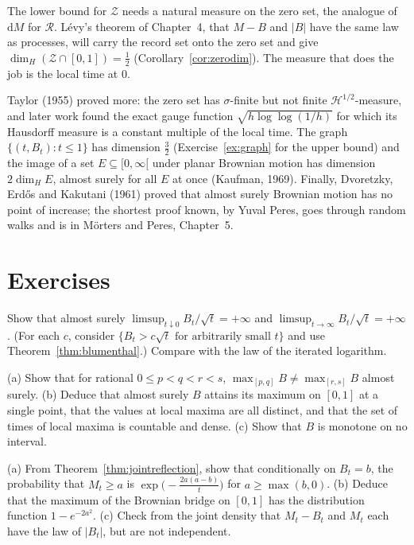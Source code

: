 The lower bound for $\mathcal Z$ needs a natural measure on the zero set, the analogue of $\mathrm dM$ for $\mathcal R$. L\'evy's theorem of Chapter~4, that $M-B$ and $|B|$ have the same law as processes, will
carry the record set onto the zero set and give $\dim_H(\mathcal Z\cap[0,1])=\frac12$ (Corollary~\ref{cor:zerodim}). The measure that does the job is the local time at $0$.

\begin{remark}
Taylor (1955) proved more: the zero set has $\sigma$-finite but not finite $\mathcal H^{1/2}$-measure, and later work found the exact gauge function $\sqrt{h\log\log(1/h)}$ for which its Hausdorff measure is
a constant multiple of the local time. The graph $\{(t,B_t):t\le1\}$ has dimension $\frac32$ (Exercise~\ref{ex:graph} for the upper bound) and the image of a set $E\subseteq[0,\infty[$ under planar Brownian motion has
dimension $2\dim_HE$, almost surely for all $E$ at once (Kaufman, 1969). Finally, Dvoretzky, Erd\H{o}s and Kakutani (1961) proved that almost surely Brownian motion has no point of increase; the shortest proof
known, by Yuval Peres, goes through random walks and is in M\"orters and Peres, Chapter~5.
\end{remark}

\section{Exercises}

\begin{exercise}[$\star$]\label{ex:limsupsqrt}
Show that almost surely $\limsup_{t\downarrow0}B_t/\sqrt t=+\infty$ and $\limsup_{t\to\infty}B_t/\sqrt t=+\infty$. (For each $c$, consider $\{B_t>c\sqrt t\text{ for arbitrarily small }t\}$ and use
Theorem~\ref{thm:blumenthal}.) Compare with the law of the iterated logarithm.
\end{exercise}

\begin{exercise}[$\star\star$]\label{ex:localmax}
(a) Show that for rational $0\le p<q<r<s$, $\max_{[p,q]}B\neq\max_{[r,s]}B$ almost surely. (b) Deduce that almost surely $B$ attains its maximum on $[0,1]$ at a single point, that the values at local maxima
are all distinct, and that the set of times of local maxima is countable and dense. (c) Show that $B$ is monotone on no interval.
\end{exercise}

\begin{exercise}[$\star\star$]\label{ex:bridgemax}
(a) From Theorem~\ref{thm:jointreflection}, show that conditionally on $B_t=b$, the probability that $M_t\ge a$ is $\exp\bigl(-\frac{2a(a-b)}t\bigr)$ for $a\ge\max(b,0)$. (b) Deduce that the maximum of the Brownian bridge
on $[0,1]$ has the distribution function $1-e^{-2a^2}$. (c) Check from the joint density that $M_t-B_t$ and $M_t$ each have the law of $|B_t|$, but are not independent.
\end{exercise}

